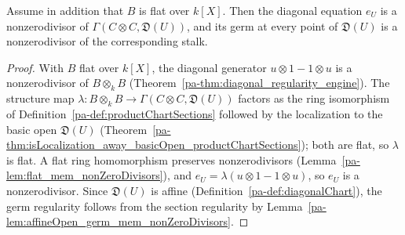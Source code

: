 \begin{theorem}
  \label{pa-thm:diagonalChartEqn_regular}
  \leanok

  Assume in addition that \(B\) is flat over \(k[X]\). Then the diagonal equation \(e_U\) is a
  nonzerodivisor of \(\Gamma(C \otimes C, \mathfrak D(U))\), and its germ at every point of
  \(\mathfrak D(U)\) is a nonzerodivisor of the corresponding stalk.
\end{theorem}
\begin{proof}
  \leanok
  With \(B\) flat over \(k[X]\), the diagonal generator \(u \otimes 1 - 1 \otimes u\) is a
  nonzerodivisor of \(B \otimes_k B\) (Theorem~\ref{pa-thm:diagonal_regularity_engine}). The structure
  map \(\lambda \colon B \otimes_k B \to \Gamma(C \otimes C, \mathfrak D(U))\) factors as the ring
  isomorphism of Definition~\ref{pa-def:productChartSections} followed by the localization to the
  basic open \(\mathfrak D(U)\)
  (Theorem~\ref{pa-thm:isLocalization_away_basicOpen_productChartSections}); both are flat, so
  \(\lambda\) is flat. A flat ring homomorphism preserves nonzerodivisors
  (Lemma~\ref{pa-lem:flat_mem_nonZeroDivisors}), and \(e_U = \lambda(u \otimes 1 - 1 \otimes u)\),
  so \(e_U\) is a nonzerodivisor. Since \(\mathfrak D(U)\) is affine
  (Definition~\ref{pa-def:diagonalChart}), the germ regularity follows from the section regularity by
  Lemma~\ref{pa-lem:affineOpen_germ_mem_nonZeroDivisors}.
\end{proof}

